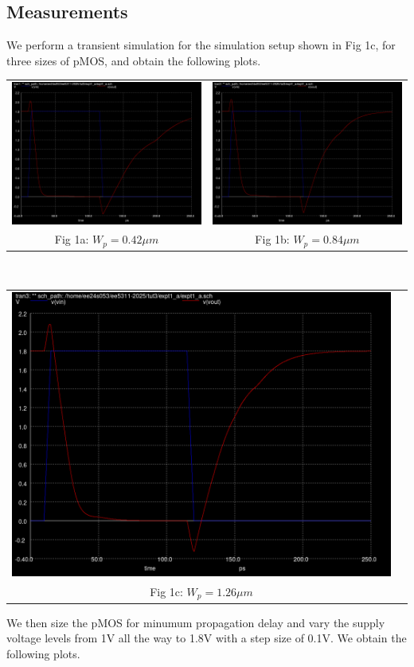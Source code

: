 \documentclass[12pt,a4paper]{article}
\begin{document}
\subsection{Measurements}
\noindent We perform a transient simulation for the simulation setup shown in Fig 1c,  for three sizes of pMOS, and obtain the following plots.
\begin{center}
\begin{tabular}{cc}
     \includegraphics[width=0.40\linewidth]{tut3/reports/media/expt1a_dly_2.png} &
     \includegraphics[width=0.40\linewidth]{tut3/reports/media/expt1a_dly_1.png} \\
     Fig 1a: $W_p = 0.42 \mu m$ & Fig 1b: $W_p = 0.84 \mu m$
\end{tabular}
\\
\begin{tabular}{cc}
     \includegraphics[width=0.40\linewidth]{tut3/reports/media/expt1a_dly_0.png} \\
     Fig 1c: $W_p = 1.26 \mu m$
\end{tabular}
\end{center}
\noindent We then size the pMOS for minumum propagation delay and vary the supply voltage levels from 1V all the way to 1.8V with a step size of 0.1V. We obtain the following plots.
\end{document}
